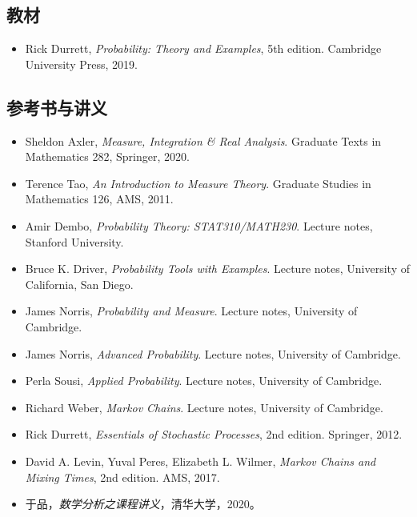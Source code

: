 
\subsection*{教材}
\begin{itemize}
  \item Rick Durrett, \emph{Probability: Theory and Examples}, 5th edition. Cambridge University Press, 2019.
\end{itemize}

\subsection*{参考书与讲义}
\begin{itemize}
  \item Sheldon Axler, \emph{Measure, Integration \& Real Analysis}. Graduate Texts in Mathematics 282, Springer, 2020.
  \item Terence Tao, \emph{An Introduction to Measure Theory}. Graduate Studies in Mathematics 126, AMS, 2011.
  \item Amir Dembo, \emph{Probability Theory: STAT310/MATH230}. Lecture notes, Stanford University.
  \item Bruce K. Driver, \emph{Probability Tools with Examples}. Lecture notes, University of California, San Diego.
  \item James Norris, \emph{Probability and Measure}. Lecture notes, University of Cambridge.
  \item James Norris, \emph{Advanced Probability}. Lecture notes, University of Cambridge.
  \item Perla Sousi, \emph{Applied Probability}. Lecture notes, University of Cambridge.
  \item Richard Weber, \emph{Markov Chains}. Lecture notes, University of Cambridge.
  \item Rick Durrett, \emph{Essentials of Stochastic Processes}, 2nd edition. Springer, 2012.
  \item David A. Levin, Yuval Peres, Elizabeth L. Wilmer, \emph{Markov Chains and Mixing Times}, 2nd edition. AMS, 2017.
  \item 于品，\emph{数学分析之课程讲义}，清华大学，2020。
\end{itemize}
